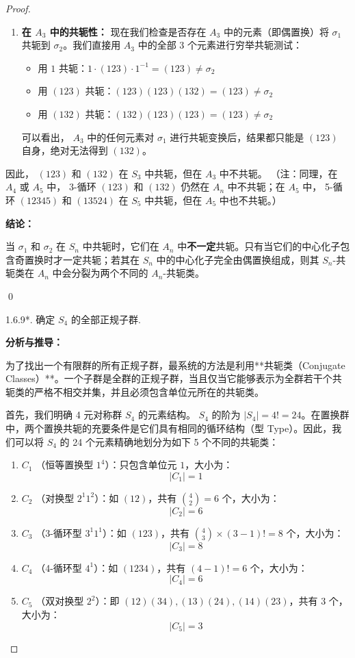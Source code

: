 \documentclass[]{article}
\begin{document}
\begin{proof}
\begin{enumerate}
	\item \textbf{在 $A_3$ 中的共轭性：}
	现在我们检查是否存在 $A_3$ 中的元素（即偶置换）将 $\sigma_1$ 共轭到 $\sigma_2$。我们直接用 $A_3$ 中的全部 3 个元素进行穷举共轭测试：
	\begin{itemize}
		\item 用 $1$ 共轭：$1 \cdot (123) \cdot 1^{-1} = (123) \neq \sigma_2$
		\item 用 $(123)$ 共轭：$(123)(123)(132) = (123) \neq \sigma_2$
		\item 用 $(132)$ 共轭：$(132)(123)(123) = (123) \neq \sigma_2$
	\end{itemize}
	可以看出， $A_3$ 中的任何元素对 $\sigma_1$ 进行共轭变换后，结果都只能是 $(123)$ 自身，绝对无法得到 $(132)$。
\end{enumerate}

因此， $(123)$ 和 $(132)$ 在 $S_3$ 中共轭，但在 $A_3$ 中不共轭。
（注：同理，在 $A_4$ 或 $A_5$ 中， 3-循环 $(123)$ 和 $(132)$ 仍然在 $A_n$ 中不共轭；在 $A_5$ 中， 5-循环 $(12345)$ 和 $(13524)$ 在 $S_5$ 中共轭，但在 $A_5$ 中也不共轭。）

\bigskip
\noindent \textbf{结论：} 

当 $\sigma_{1}$ 和 $\sigma_{2}$ 在 $S_{n}$ 中共轭时，它们在 $A_{n}$ 中\textbf{不一定}共轭。只有当它们的中心化子包含奇置换时才一定共轭；若其在 $S_n$ 中的中心化子完全由偶置换组成，则其 $S_n$-共轭类在 $A_n$ 中会分裂为两个不同的 $A_n$-共轭类。

\qed

1.6.9*. 确定 $S_{4}$ 的全部正规子群. 

\bigskip
\noindent \textbf{分析与推导：} 

为了找出一个有限群的所有正规子群，最系统的方法是利用**共轭类（Conjugate Classes）**。一个子群是全群的正规子群，当且仅当它能够表示为全群若干个共轭类的严格不相交并集，并且必须包含单位元所在的共轭类。

首先，我们明确 4 元对称群 $S_4$ 的元素结构。 $S_4$ 的阶为 $|S_4| = 4! = 24$。在置换群中，两个置换共轭的充要条件是它们具有相同的循环结构（型 Type）。因此，我们可以将 $S_4$ 的 24 个元素精确地划分为如下 5 个不同的共轭类：

\begin{enumerate}
	\item $C_1$ （恒等置换型 $1^4$）：只包含单位元 $1$，大小为：
	\[ |C_1| = 1 \]
	\item $C_2$ （对换型 $2^1 1^2$）：如 $(12)$，共有 $\binom{4}{2} = 6$ 个，大小为：
	\[ |C_2| = 6 \]
	\item $C_3$ （3-循环型 $3^1 1^1$）：如 $(123)$，共有 $\binom{4}{3} \times (3-1)! = 8$ 个，大小为：
	\[ |C_3| = 8 \]
	\item $C_4$ （4-循环型 $4^1$）：如 $(1234)$，共有 $(4-1)! = 6$ 个，大小为：
	\[ |C_4| = 6 \]
	\item $C_5$ （双对换型 $2^2$）：即 $(12)(34), (13)(24), (14)(23)$，共有 3 个，大小为：
	\[ |C_5| = 3 \]
\end{enumerate}


\end{proof}
\end{document}

